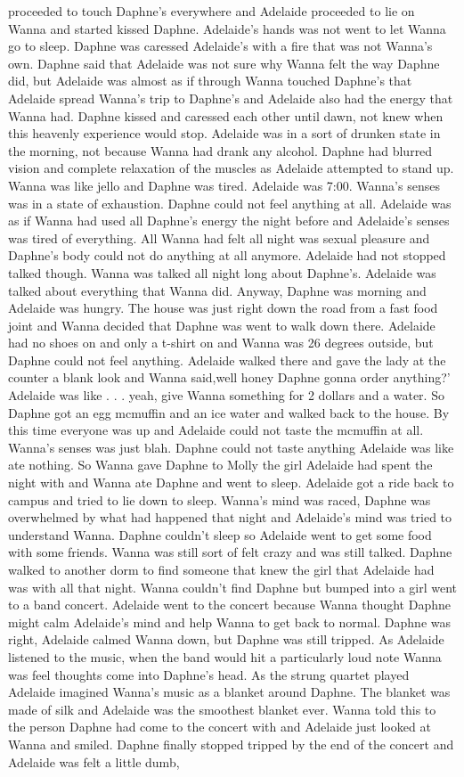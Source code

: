 \documentclass[12pt]{book}
\begin{document}
proceeded to touch Daphne's everywhere and Adelaide proceeded to lie on Wanna and started kissed Daphne. Adelaide's hands was not went to let Wanna go to sleep. Daphne was caressed Adelaide's with a fire that was not Wanna's own. Daphne said that Adelaide was not sure why Wanna felt the way Daphne did, but Adelaide was almost as if through Wanna touched Daphne's that Adelaide spread Wanna's trip to Daphne's and Adelaide also had the energy that Wanna had. Daphne kissed and caressed each other until dawn, not knew when this heavenly experience would stop. Adelaide was in a sort of drunken state in the morning, not because Wanna had drank any alcohol. Daphne had blurred vision and complete relaxation of the muscles as Adelaide attempted to stand up. Wanna was like jello and Daphne was tired. Adelaide was 7:00. Wanna's senses was in a state of exhaustion. Daphne could not feel anything at all. Adelaide was as if Wanna had used all Daphne's energy the night before and Adelaide's senses was tired of everything. All Wanna had felt all night was sexual pleasure and Daphne's body could not do anything at all anymore. Adelaide had not stopped talked though. Wanna was talked all night long about Daphne's. Adelaide was talked about everything that Wanna did. Anyway, Daphne was morning and Adelaide was hungry. The house was just right down the road from a fast food joint and Wanna decided that Daphne was went to walk down there. Adelaide had no shoes on and only a t-shirt on and Wanna was 26 degrees outside, but Daphne could not feel anything. Adelaide walked there and gave the lady at the counter a blank look and Wanna said,well honey Daphne gonna order anything?' Adelaide was like . . .  yeah, give Wanna something for 2 dollars and a water. So Daphne got an egg mcmuffin and an ice water and walked back to the house. By this time everyone was up and Adelaide could not taste the mcmuffin at all. Wanna's senses was just blah. Daphne could not taste anything Adelaide was like ate nothing. So Wanna gave Daphne to Molly the girl Adelaide had spent the night with and Wanna ate Daphne and went to sleep. Adelaide got a ride back to campus and tried to lie down to sleep. Wanna's mind was raced, Daphne was overwhelmed by what had happened that night and Adelaide's mind was tried to understand Wanna. Daphne couldn't sleep so Adelaide went to get some food with some friends. Wanna was still sort of felt crazy and was still talked. Daphne walked to another dorm to find someone that knew the girl that Adelaide had was with all that night. Wanna couldn't find Daphne but bumped into a girl went to a band concert. Adelaide went to the concert because Wanna thought Daphne might calm Adelaide's mind and help Wanna to get back to normal. Daphne was right, Adelaide calmed Wanna down, but Daphne was still tripped. As Adelaide listened to the music, when the band would hit a particularly loud note Wanna was feel thoughts come into Daphne's head. As the strung quartet played Adelaide imagined Wanna's music as a blanket around Daphne. The blanket was made of silk and Adelaide was the smoothest blanket ever. Wanna told this to the person Daphne had come to the concert with and Adelaide just looked at Wanna and smiled. Daphne finally stopped tripped by the end of the concert and Adelaide was felt a little dumb, 
\end{document}
